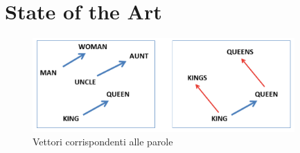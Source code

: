 


\section{State of the Art}

\begin{figure}[htb]
	\centering
	\includegraphics[width = 100mm]{images/king-queen.png}
	\caption{Vettori corrispondenti alle parole}
	\label{2w2v}
\end{figure}